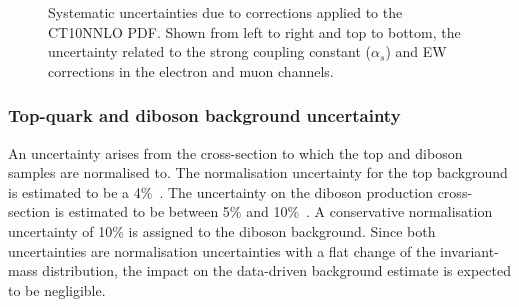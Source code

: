 \begin{figure}[h!]
\begin{subfigure}[h]{0.42\textwidth}
        \label{fig:uncert:eeEW}
    \end{subfigure}
    \caption{Systematic uncertainties due to corrections applied to the CT10NNLO PDF. Shown from left to right and top to bottom, the uncertainty related to the strong coupling constant ($\alpha_s$) and EW corrections in the electron and muon channels.}
    \label{fig:uncert:theoryConstants}
\end{figure}

\subsubsection{Top-quark and diboson background uncertainty}
An uncertainty arises from the cross-section to which the top and diboson samples are normalised to. The normalisation uncertainty for the top background is estimated to be a 4\%~\cite{Czakon:2011xx}. The uncertainty on the diboson production cross-section is estimated to be between 5\% and 10\%~\cite{Butterworth:1287902}. A conservative normalisation uncertainty of 10\% is assigned to the diboson background. Since both uncertainties are normalisation uncertainties with a flat change of the invariant-mass distribution, the impact on the data-driven background estimate is expected to be negligible. 

\clearpage